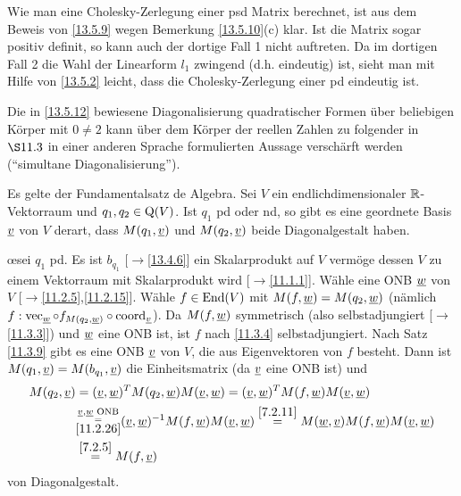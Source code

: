 \documentclass[../../main.tex]{subfiles}
\begin{document}
\begin{bem}\label{14.2.14}
    Wie man eine Cholesky-Zerlegung einer psd Matrix berechnet, ist aus dem Beweis von \ref{13.5.9} wegen Bemerkung \ref{13.5.10}(c) klar. Ist die Matrix sogar positiv definit, so kann auch der dortige Fall 1 nicht auftreten. Da im dortigen Fall 2 die Wahl der Linearform $l_1$ zwingend (d.h. eindeutig) ist, sieht man mit Hilfe von \ref{13.5.2} leicht, dass die Cholesky-Zerlegung einer pd eindeutig ist.
\end{bem}

Die in \ref{13.5.12} bewiesene Diagonalisierung quadratischer Formen über beliebigen Körper mit $0\neq 2$ kann über dem Körper der reellen Zahlen zu folgender in $\S 11.3$ in einer anderen Sprache formulierten Aussage verschärft werden (\enquote{simultane Diagonalisierung}).

\begin{sat}\label{14.2.15}
    Es gelte der Fundamentalsatz de Algebra. Sei $V$ ein endlichdimensionaler $\mathbb R$-Vektorraum und $q_1,q_2\in \operatorname{Q}(V)$. Ist $q_1$ pd oder nd, so gibt es eine geordnete Basis ${\underline v}$ von $V$ derart, dass $M(q_1,{\underline v})$ und $M(q_2,{\underline v})$ beide Diagonalgestalt haben.
\end{sat}
\begin{cproof}
    \oe sei $q_1$ pd. Es ist $b_{q_1}$ [$\to$\ref{13.4.6}] ein Skalarprodukt auf $V$ vermöge dessen $V$ zu einem Vektorraum mit Skalarprodukt wird [$\to$\ref{11.1.1}]. Wähle eine ONB ${\underline w}$ von $V$ [$\to$\ref{11.2.5},\ref{11.2.15}]. Wähle $f\in\operatorname{End}(V)$ mit $M(f,{\underline w})=M(q_2,{\underline w})$ (nämlich $f:\operatorname{vec}_{\underline w}\circ f_{M(q_2,{\underline w})}\circ\operatorname{coord}_{\underline v}$). Da $M(f,{\underline w})$ symmetrisch (also selbstadjungiert [$\to$\ref{11.3.3}]) und ${\underline w}$ eine ONB ist, ist $f$ nach \ref{11.3.4} selbstadjungiert. Nach Satz \ref{11.3.9} gibt es eine ONB ${\underline v}$ von $V$, die aus Eigenvektoren von $f$ besteht. Dann ist $M(q_1,{\underline v})=M(b_{q_1},{\underline v})$ die Einheitsmatrix (da ${\underline v}$ eine ONB ist) und
    \begin{align*}
        M(q_2,{\underline v})&=({\underline v},{\underline w})^TM(q_2,{\underline w})M({\underline v},{\underline w})=({\underline v},{\underline w})^TM(f,{\underline w})M({\underline v},{\underline w})\\
        &\substack{{\underline v},{\underline w}\text{ ONB}\\=\\\ref{11.2.26}}({\underline v},{\underline w})^{-1}M(f,{\underline w})M({\underline v},{\underline w})\stackrel{\ref{7.2.11}}{=}M({\underline w},{\underline v})M(f,{\underline w})M({\underline v},{\underline w})\\
        &\stackrel{\ref{7.2.5}}{=}M(f,{\underline v})
    \end{align*}
    von Diagonalgestalt.
\end{cproof}
\end{document}
